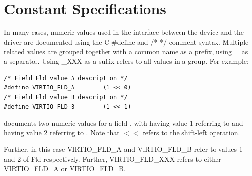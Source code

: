 \section{Constant Specifications}\label{sec:Constant Specifications}

In many cases, numeric values used in the interface between the device
and the driver are documented using the C \#define and /* */
comment syntax. Multiple related values are grouped together with
a common name as a prefix, using _ as a separator.
Using _XXX as a suffix refers to all values in a group.
For example:

\begin{lstlisting}
/* Field Fld value A description */
#define VIRTIO_FLD_A        (1 << 0)
/* Field Fld value B description */
#define VIRTIO_FLD_B        (1 << 1)
\end{lstlisting}
documents two numeric values for a field , with
 having value 1 referring to  and 
having value 2 referring to .
Note that $<<$ refers to the shift-left operation.

Further, in this case VIRTIO_FLD_A and VIRTIO_FLD_B
refer to values 1 and 2 of Fld respectively. Further, VIRTIO_FLD_XXX refers to
either VIRTIO_FLD_A or VIRTIO_FLD_B.

\newpage

